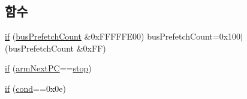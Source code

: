 \subsection*{함수}
\begin{DoxyCompactItemize}
\item 
\mbox{\hyperlink{arm-new_8h_a93120066fd6daa54150af823953378d1}{if}} (\mbox{\hyperlink{_g_b_a_8cpp_a74b6e155b69495625690638f2713fc4a}{bus\+Prefetch\+Count}} \&0x\+F\+F\+F\+F\+F\+E00) bus\+Prefetch\+Count=0x100$\vert$(bus\+Prefetch\+Count \&0x\+F\+F)
\item 
\mbox{\hyperlink{arm-new_8h_aca0d2021022767d4ac93ab2232d4516e}{if}} (\mbox{\hyperlink{thumb_8h_a7e8bf67a6667274a53fc092b97961ca4}{arm\+Next\+PC}}==\mbox{\hyperlink{_globals_8h_aab84c44d931c6e2d40f35f5831bfed51}{stop}})
\item 
\mbox{\hyperlink{arm-new_8h_a24f39fae4e25f77789f6de1207e383e7}{if}} (\mbox{\hyperlink{arm-new_8h_a33a0b4d4eea3603435124a4255231922}{cond}}==0x0e)
\end{DoxyCompactItemize}
